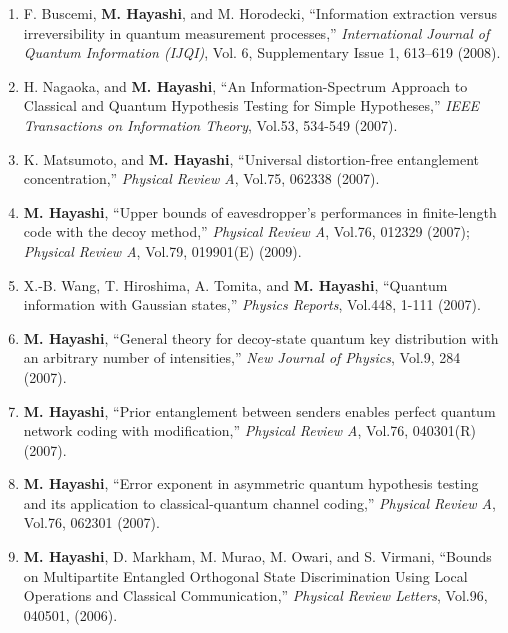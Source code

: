 \documentclass[a4paper,12pt,oneside]{article}
\begin{document}
\begin{enumerate}
\item F. Buscemi, \textbf{M. Hayashi}, and M. Horodecki, 
``Information extraction versus irreversibility in quantum measurement processes,''
{\em International Journal of Quantum Information (IJQI)}, 
Vol. 6, Supplementary Issue 1, 613--619 (2008). 

\item
H. Nagaoka, and \textbf{M. Hayashi}, ``An Information-Spectrum Approach to Classical and Quantum Hypothesis Testing for Simple Hypotheses,'' 
{\em IEEE Transactions on Information Theory}, Vol.53, 534-549 (2007).

\item
K. Matsumoto, and \textbf{M. Hayashi}, ``Universal distortion-free entanglement concentration,'' 
{\em Physical Review A}, Vol.75, 062338 (2007).

\item 
\textbf{M. Hayashi}, ``Upper bounds of eavesdropper's performances in finite-length code with the decoy method,'' 
{\em Physical Review A}, Vol.76, 012329 (2007); 
{\em Physical Review A}, Vol.79, 019901(E) (2009).

\item
X.-B. Wang, T. Hiroshima, A. Tomita, and \textbf{M. Hayashi}, ``Quantum information with Gaussian states,'' 
{\em Physics Reports}, Vol.448, 1-111 (2007).

\item
\textbf{M. Hayashi}, ``General theory for decoy-state quantum key distribution with an arbitrary number of intensities,'' 
{\em New Journal of Physics}, Vol.9, 284 (2007).

\item
\textbf{M. Hayashi}, ``Prior entanglement between senders enables perfect quantum network coding with modification,'' 
{\em Physical Review A}, Vol.76, 040301(R) (2007).

\item
\textbf{M. Hayashi}, ``Error exponent in asymmetric quantum hypothesis testing and its application to classical-quantum channel coding,''
{\em Physical Review A}, Vol.76, 062301 (2007).

\item 
\textbf{M. Hayashi}, D. Markham, M. Murao, M. Owari, and S. Virmani, 
``Bounds on Multipartite Entangled Orthogonal State Discrimination Using Local Operations and Classical Communication,'' 
{\em Physical Review Letters}, Vol.96, 040501, (2006).


\end{enumerate}
\end{document}
